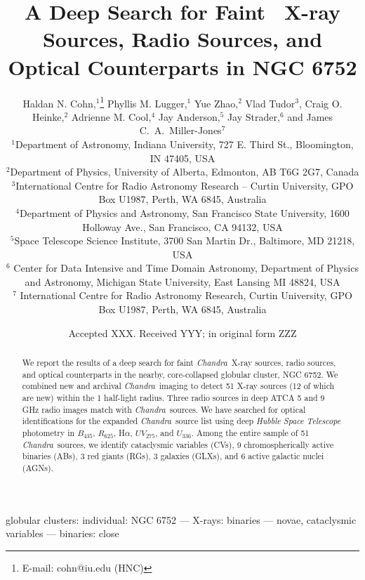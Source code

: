 \documentclass[fleqn,usenatbib]{mnras}
\title[Faint \chandra\ Sources in NGC 6752]{A Deep Search for Faint \chandra\ X-ray Sources, Radio Sources, and Optical Counterparts in NGC 6752}
\author[H.N. Cohn et al.]{%
Haldan N. Cohn,$^{1}$\thanks{E-mail: cohn@iu.edu (HNC)}
Phyllis M. Lugger,$^{1}$
Yue Zhao,$^{2}$
Vlad Tudor$^{3}$,
Craig O. Heinke,$^{2}$\newauthor
Adrienne M. Cool,$^{4}$
Jay Anderson,$^{5}$
Jay Strader,$^{6}$ and
James C.~A.~Miller-Jones$^{7}$\\
$^{1}$Department of Astronomy, Indiana University, 727 E. Third St.,
Bloomington, IN 47405, USA\\
$^{2}$Department of Physics, University of Alberta, Edmonton, AB T6G
2G7, Canada\\
$^{3}$International Centre for Radio Astronomy Research -- Curtin University, GPO Box U1987, Perth, WA 6845, Australia\\
$^{4}$Department of Physics and Astronomy, San Francisco State
University, 1600 Holloway Ave., San Francisco, CA 94132, USA\\
$^{5}$Space Telescope Science Institute, 3700 San Martin Dr.,
Baltimore, MD 21218, USA\\
$^{6}$ Center for Data Intensive and Time Domain Astronomy, Department of Physics and Astronomy, Michigan State University, East Lansing MI 48824, USA\\
$^{7}$ International Centre for Radio Astronomy Research, Curtin University, GPO Box U1987, Perth, WA 6845, Australia}
\date{Accepted XXX. Received YYY; in original form ZZZ}
\newcommand{\chandra}{\emph{Chandra}}
\newcommand{\B}{\mbox{$B_{435}$}}
\newcommand{\R}{\mbox{$R_{625}$}}
\newcommand{\ha}{\mbox{H$\alpha$}}
\newcommand{\UV}{\mbox{$UV_{275}$}}
\newcommand{\U}{\mbox{$U_{336}$}}
\newcommand{\revised}[1]{{\color{black}{#1}}}
\begin{document}
\label{firstpage}
\pagerange{\pageref{firstpage}--\pageref{lastpage}}
\maketitle

\begin{abstract}

We report the results of a deep search for faint \chandra\ X-ray sources, radio sources, and optical counterparts in the nearby, core-collapsed globular cluster, NGC 6752. We combined new and archival \chandra\ imaging to detect 51 X-ray sources (12 of which are new) within the 1 half-light radius. Three radio sources in deep ATCA 5 and 9 GHz radio images match with \chandra\ sources. We have searched for optical identifications for the expanded \chandra\ source list using deep \emph{Hubble Space Telescope} photometry in \B, \R, \ha, \UV, and \U. Among the entire sample of 51 \chandra\ sources, we identify \revised{18}
cataclysmic variables (CVs), 9 chromospherically active binaries (ABs), 3 red giants (RGs), 3 galaxies (GLXs), and 6 active galactic nuclei (AGNs). \revised{Three of the sources are associated with millisecond pulsars (MSPs).} \revised{As in our previous study of NGC 6752, we find that the brightest CVs appear to be more centrally concentrated than are the faintest CVs, although the effect is no longer statistically significant as a consequence of the inclusion in the faint group of two intermediate brightness CVs. This possible difference in the radial distributions of the bright and faint CV groups appears to indicate that mass segregation has separated them. We note that photometric incompleteness in the crowded central region of the cluster may also play a role. Both groups of CVs have an inferred mass above that of the main-sequence turnoff stars. We discuss the implications for the masses of the CV components.} 

\end{abstract}

\begin{keywords}
globular clusters: individual: NGC 6752 --- X-rays:
binaries --- novae, cataclysmic variables --- binaries: close
\end{keywords}


\end{document}
